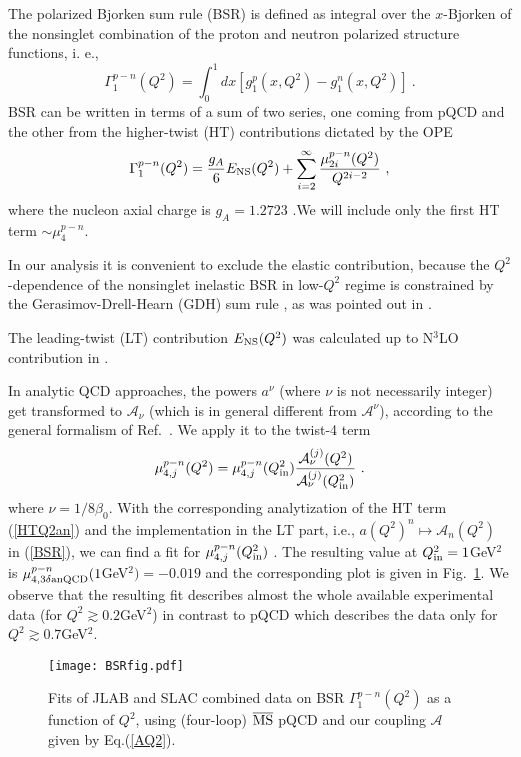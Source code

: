 \documentclass[3p,times,twocolumn]{elsarticle}
\def\be{\begin{equation}}
\def\ee{\end{equation}}
\newcommand{\A}{{\mathcal{A}}}
\begin{document}
The polarized Bjorken sum rule (BSR) is defined as integral over the $x$-Bjorken of the nonsinglet combination of the proton and neutron polarized structure functions, i. e., 
\be
\Gamma_1^{p-n}(Q^2)=\int_0^1 dx \left[g_1^p(x,Q^2)-g_1^n(x,Q^2) \right]\ .
\label{BSRdef}
\ee 
BSR can be written in terms of a sum of two series, one coming from pQCD and the other from the higher-twist (HT) contributions dictated by the 
OPE \cite{BjorkenSR}
\be
\label{BSR}
\Gamma_1^{p-n}(Q^2)=\frac{g_A}{6}E_{\rm {NS}}(Q^2)+\sum_{i=2}^\infty
\frac{\mu_{2i}^{p-n}(Q^2)}{Q^{2i-2}}\ ,
\ee
 where the nucleon axial charge is $g_A=1.2723$ \cite{PDG2016}.We will include only the first HT term $\sim \mu_4^{p-n}$.

In our analysis it is convenient to exclude the elastic contribution, because the $Q^2$-dependence of the nonsinglet inelastic BSR in low-$Q^2$ regime is constrained by the Gerasimov-Drell-Hearn (GDH) sum rule \cite{GDHlow}, as was pointed out in \cite{PSTSK10}. 

The leading-twist (LT) contribution $E_{\rm {NS}}(Q^2)$ was calculated up to N$^3$LO contribution in \cite{nnnloBSR}.  

In analytic QCD approaches, the powers $a^{\nu}$ (where $\nu$ is not necessarily integer) get transformed to $\A_{\nu}$ (which is in general different from $\A^\nu$), according to the general formalism of Ref.~\cite{GCAK}. We apply it to the twist-4 term \cite{anBSR}
\be
\mu_{4,j}^{p-n}(Q^2)=\mu_{4,j}^{p-n}(Q_{\rm in}^2) \frac{\A_{\nu}^{(j)}(Q^2)}
{\A_{\nu}^{(j)}(Q_{\rm in}^2)}\ .
\label{HTQ2an}
\ee
where $\nu=1/8\beta_0$.
With the corresponding analytization of the HT term (\ref{HTQ2an}) and the implementation in the LT part, i.e., $a(Q^2)^n\mapsto\A_n(Q^2)$ in (\ref{BSR}), we can find a fit for $\mu_{4,j}^{p-n}(Q_{\rm in}^2)$ \cite{anBSR}. The resulting value at $Q_{\rm in}^2=1$GeV$^2$ is $\mu_{4,3\delta{\rm anQCD}}^{p-n}(1$GeV$^2)=-0.019$ and the corresponding plot is given in Fig.~\ref{FigFitNf3}.  We observe that the resulting fit describes almost the whole available experimental data (for $Q^2\gtrsim0.2$GeV$^2$) in contrast to pQCD which describes the data only for $Q^2\gtrsim0.7$GeV$^2$.

\begin{figure}[htb]
\vspace{9pt}
\centering\texttt{[image: BSRfig.pdf]}
\caption{Fits of JLAB and SLAC combined data \cite{dataBSR} on BSR $\Gamma_1^{p-n}(Q^2)$ as a function of $Q^2$, using (four-loop) $\overline{\rm MS}$ pQCD and our coupling $\A$ given by Eq.(\ref{AQ2}).}
\label{FigFitNf3}
\end{figure}
\end{document}

